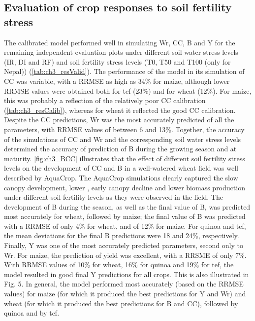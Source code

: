 \subsection{Evaluation of crop responses to soil fertility stress}
The calibrated model performed well in simulating Wr, CC, B and Y for the remaining independent evaluation plots under different soil water stress levels (IR, DI and RF) and soil fertility stress levels (T0, T50 and T100 (only for Nepal)) (\autoref{tab:ch3_resValid}). The performance of the model in its simulation of CC was variable, with a RRMSE as high as 34\% for maize, although lower RRMSE values were obtained both for tef (23\%) and for wheat (12\%). For maize, this was probably a reflection of the relatively poor CC calibration (\autoref{tab:ch3_resCalib}), whereas for wheat it reflected the good CC calibration. Despite the CC predictions, Wr was the most accurately predicted of all the parameters, with RRMSE values of between 6 and 13\%. Together, the accuracy of the simulations of CC and Wr and the corresponding soil water stress levels determined the accuracy of prediction of B during the growing season and at maturity. \autoref{fig:ch3_BCC} illustrates that the effect of different soil fertility stress levels on the development of CC and B in a well-watered wheat field was well described by AquaCrop. The AquaCrop simulations clearly captured the slow canopy development, lower \CCx, early canopy decline and lower biomass production under different soil fertility levels as they were observed in the field. The development of B during the season, as well as the final value of B, was predicted most accurately for wheat, followed by maize; the final value of B was predicted with a RRMSE of only 4\% for wheat, and of 12\% for maize. For quinoa and tef, the mean deviations for the final B predictions were 18 and 24\%, respectively. Finally, Y was one of the most accurately predicted parameters, second only to Wr. For maize, the prediction of yield was excellent, with a RRSME of only 7\%. With RRMSE values of 10\% for wheat, 16\% for quinoa and 19\% for tef, the model resulted in good final Y predictions for all crops. This is also illustrated in Fig. 5. In general, the model performed most accurately (based on the RRMSE values) for maize (for which it produced the best predictions for Y and Wr) and wheat (for which it produced the best predictions for B and CC), followed by quinoa and by tef. 

